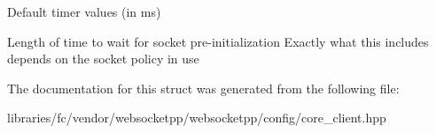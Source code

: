 Default timer values (in ms) 

Length of time to wait for socket pre-\/initialization Exactly what this includes depends on the socket policy in use 

The documentation for this struct was generated from the following file\+:\begin{DoxyCompactItemize}
\item 
libraries/fc/vendor/websocketpp/websocketpp/config/core\+\_\+client.\+hpp\end{DoxyCompactItemize}
